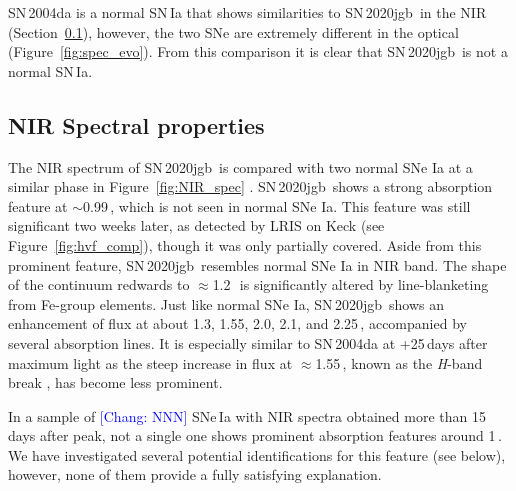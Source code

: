 \documentclass[twocolumn]{aastex631}
\newcommand{\sn}{SN\,2020jgb}
\newcommand{\chang}[1]{\textcolor{blue}{[Chang: #1]}}
\begin{document}
SN\,2004da is a normal SN\,Ia that shows similarities to \sn\ in the NIR (Section~\ref{sec:NIR_spec}), however, the two SNe are extremely different in the optical (Figure~\ref{fig:spec_evo}). From this comparison it is clear that \sn\ is not a normal SN\,Ia. 

\subsection{NIR Spectral properties}
\label{sec:NIR_spec}
The NIR spectrum of \sn\ is compared with two normal SNe Ia at a similar phase in Figure~\ref{fig:NIR_spec} \citep[data for SNe\,2004ab and 2004da from][]{Marion2009_NIR}. \sn\ shows a strong absorption feature at $\sim$0.99\,\micron, which is not seen in normal SNe Ia. This feature was still significant two weeks later, as detected by LRIS on Keck (see Figure~\ref{fig:hvf_comp}), though it was only partially covered. Aside from this prominent feature, \sn\ resembles normal SNe Ia in NIR band. The shape of the continuum redwards to $\approx$1.2\,\micron\ is significantly altered by line-blanketing from Fe-group elements. Just like normal SNe Ia, \sn\ shows an enhancement of flux at about 1.3, 1.55, 2.0, 2.1, and 2.25\,\micron, accompanied by several  absorption lines. It is especially similar to SN\,2004da at +25\,days after maximum light as the steep increase in flux at $\approx$1.55\,\micron, known as the \textit{H}-band break \citep{Hsiao_CSP_2019}, has become less prominent.%

In a sample of \chang{NNN} SNe\,Ia with NIR spectra obtained more than 15\,days after peak, not a single one shows prominent absorption features around 1\,\micron \citet{Marion2009_NIR}. We have investigated several potential identifications for this feature (see below), however, none of them provide a fully satisfying explanation.
\end{document}
